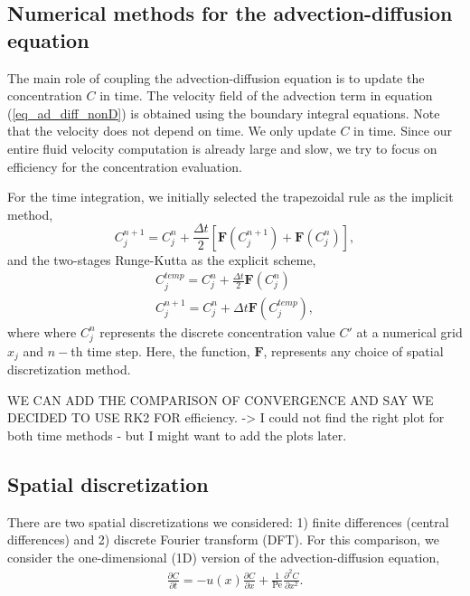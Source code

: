 \subsection{Numerical methods for the advection-diffusion equation}
The main role of coupling the advection-diffusion equation is to update the concentration $C$ in time. The velocity field of the advection term in equation (\ref{eq_ad_diff_nonD}) is obtained using the boundary integral equations. Note that the velocity does not depend on time. 
We only update $C$ in time. Since our entire fluid velocity computation is already large and slow, we try to focus on efficiency for the concentration evaluation.
\par
For the time integration, 
we initially selected the trapezoidal rule as the implicit method,
\begin{equation}
	C_{j}^{n+1}
	 = C_{j}^{n}+ \frac{\Delta t}{2 } \left[  {\bm F} \left(C_j^{n+1} \right)+ {\bm F}\left(C_j^{n} \right) \right],
	 \label{eq_trap}
\end{equation}
and the two-stages Runge-Kutta as the explicit scheme,
\begin{align}
	C_{j}^{temp} = C_j^{n} + \frac{\Delta t}{2} {\bm F} \left( C_j^{n} \right)
	\\ 
	C_j^{n+1} = C_j^{n} + \Delta t {\bm F} \left( C_j^{temp} \right),
\end{align}
where where $C_j^n$  represents the discrete concentration value $C'$ at a numerical grid $x_j$ and $n-$th time step.
Here, the function, $\bm{F}$, represents any choice of spatial discretization method. 

{\color{blue}WE CAN ADD THE COMPARISON OF CONVERGENCE AND SAY WE DECIDED TO USE RK2 FOR efficiency. -> I could not find the right plot for both time methods - but I might want to add the plots later.}
\subsection{Spatial discretization}
There are two spatial discretizations we considered: 1) finite differences (central differences) and 2) discrete Fourier transform (DFT). 
For this comparison, we consider the one-dimensional (1D) version of the advection-diffusion equation,
\begin{align}
	\frac{\partial C}{\partial t} = 
	- u(x) \frac{\partial C}{\partial x} 
	+ \frac{1}{\text{Pe}} \frac{\partial^2 C}{\partial x^2}.
	\label{eq_space_C}
\end{align}

